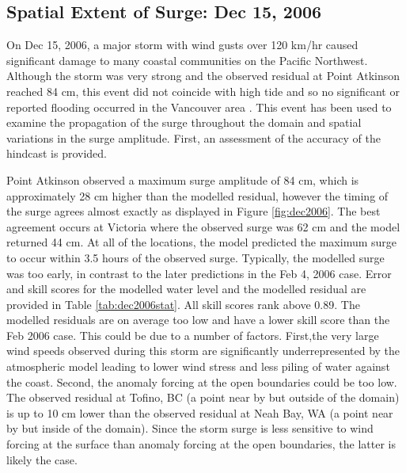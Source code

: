 \documentclass[pdftex,10pt]{article}
\begin{document}
\subsection{Spatial Extent of Surge: Dec 15, 2006}
On Dec 15, 2006, a major storm with wind gusts over 120 km/hr caused significant damage to many coastal communities on the Pacific Northwest. Although the storm was very strong and the observed residual at Point Atkinson reached 84 cm, this event did not coincide with high tide and so no significant or reported flooding occurred in the Vancouver area \citep{forseth2006adaptation}. This event has been used to examine the propagation of the surge throughout the domain and spatial variations in the surge amplitude. First, an assessment of the accuracy of the hindcast is provided. 

Point Atkinson observed a maximum surge amplitude of 84 cm, which is approximately 28 cm higher than the modelled residual, however the timing of the surge agrees almost exactly as displayed in Figure \ref{fig:dec2006}. The best agreement occurs at Victoria where the observed surge was 62 cm and the model returned 44 cm. At all of the locations, the model predicted the maximum surge to occur within 3.5 hours of the observed surge. Typically, the modelled surge was too early, in contrast to the later predictions in the Feb 4, 2006 case. Error and skill scores for the modelled water level and the modelled residual are provided in Table \ref{tab:dec2006stat}. All skill scores rank above 0.89. The modelled residuals are on average too low and have a lower skill score than the Feb 2006 case. This could be due to a number of factors. First,the very large wind speeds observed during this storm are significantly underrepresented by the atmospheric model leading to lower wind stress and less piling of water against the coast. Second, the anomaly forcing at the open boundaries could be too low. The observed residual at Tofino, BC (a point near by but outside of the domain) is up to 10 cm lower than the observed residual at Neah Bay, WA (a point near by but inside of the domain). Since the storm surge is less sensitive to wind forcing at the surface than anomaly forcing at the open boundaries, the latter is likely the case. 
\end{document}
